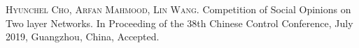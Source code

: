\begin{publications}{99}
    \item\textsc{Hyunchel Cho, Arfan Mahmood, Lin Wang}. {Competition of Social Opinions on Two layer Networks}. In Proceeding of the 38th Chinese Control Conference, July 2019, Guangzhou, China, Accepted.
\end{publications}
